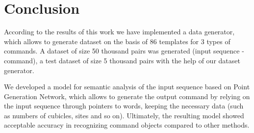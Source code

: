 \documentclass{article}
\begin{document}
\section{Conclusion}
According to the results of this work we have implemented a data generator, which allows to generate dataset on the basis of 86 templates for 3 types of commands. A dataset of size 50 thousand pairs was generated (input sequence - command), a test dataset of size 5 thousand pairs with the help of our dataset generator. 

We developed a model for semantic analysis of the input sequence based on Point Generation Network, which allows to generate the output command by relying on the input sequence through pointers to words, keeping the necessary data (such as numbers of cubicles, sites and so on). Ultimately, the resulting model showed acceptable accuracy in recognizing command objects compared to other methods. 



\end{document}
